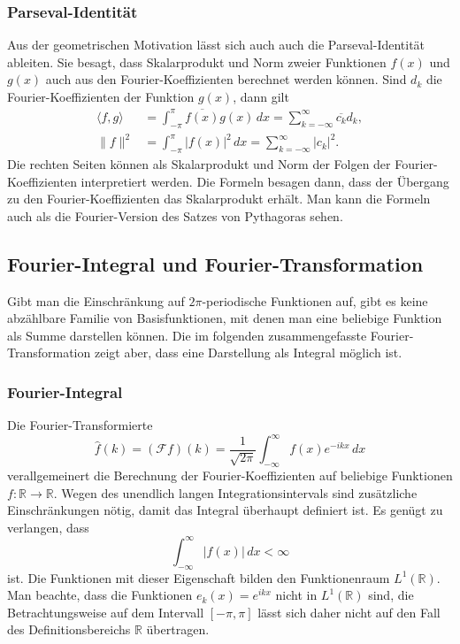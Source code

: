 \subsubsection{Parseval-Identität}
Aus der geometrischen Motivation lässt sich auch auch die
Parseval-Identität ableiten.
Sie besagt, dass Skalarprodukt und Norm zweier Funktionen
$f(x)$ und $g(x)$ auch aus den Fourier-Koeffizienten
berechnet werden können.
Sind $d_k$ die Fourier-Koeffizienten der Funktion $g(x)$, dann gilt
\begin{align*}
\langle f,g\rangle
&=
\int_{-\pi}^\pi \overline{f(x)} g(x)\,dx
=
\sum_{k=-\infty}^\infty \overline{c_k}d_k,
\\
\|f\|^2
&=
\int_{-\pi}^\pi |f(x)|^2\,dx
=
\sum_{k=-\infty}^{\infty} |c_k|^2.
\end{align*}
Die rechten Seiten können als Skalarprodukt und Norm der Folgen
der Fourier-Koeffizienten interpretiert werden.
Die Formeln besagen dann, dass der Übergang zu den Fourier-Koeffizienten
das Skalarprodukt erhält.
Man kann die Formeln auch als die Fourier-Version des Satzes
von Pythagoras sehen.

%
%
\subsection{Fourier-Integral und Fourier-Transformation}
Gibt man die Einschränkung auf $2\pi$-periodische Funktionen
auf, gibt es keine abzählbare Familie von Basisfunktionen, mit denen
man eine beliebige Funktion als Summe darstellen können.
Die im folgenden zusammengefasste Fourier-Transformation zeigt
aber, dass eine Darstellung als Integral möglich ist.

\subsubsection{Fourier-Integral}
Die Fourier-Transformierte
\begin{equation}
\hat{f}(k)
=
(\mathscr{F}f)(k)
=
\frac{1}{\sqrt{2\pi}}
\int_{-\infty}^\infty f(x)e^{-ikx}\,dx
\label{buch:fourier:eqn:fouriertrafo}
\end{equation}
verallgemeinert die Berechnung der Fourier-Koeffizienten
auf beliebige Funktionen $f\colon\mathbb{R}\to\mathbb{R}$.
Wegen des unendlich langen Integrationsintervals sind zusätzliche
Einschränkungen nötig, damit das Integral überhaupt definiert ist.
Es genügt zu verlangen, dass
\[
\int_{-\infty}^\infty |f(x)|\,dx < \infty
\]
ist.
Die Funktionen mit dieser Eigenschaft bilden den Funktionenraum
$L^1(\mathbb{R})$.
Man beachte, dass die Funktionen
\(
e_k(x) = e^{ikx}
\)
nicht in $L^1(\mathbb{R})$ sind, die Betrachtungsweise auf dem
Intervall $[-\pi,\pi]$ lässt sich daher nicht auf den Fall des
Definitionsbereichs $\mathbb{R}$ übertragen.

